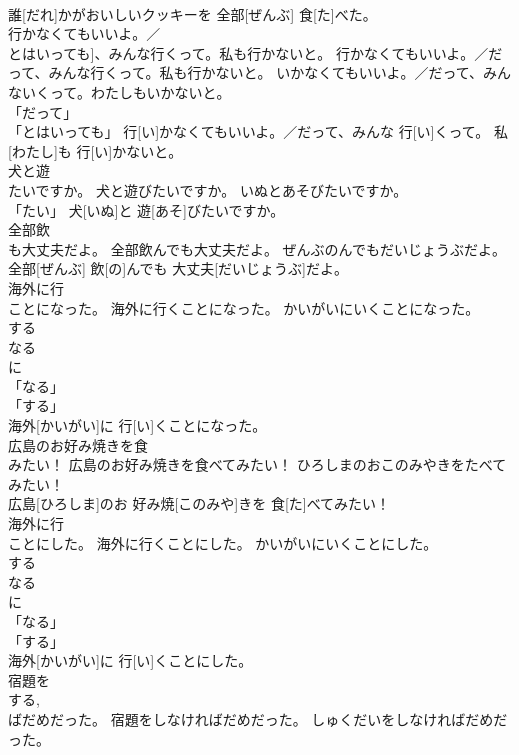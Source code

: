 \documentclass[8pt]{extreport}
\begin{document}
\begin{CJK}{UTF8}{min}
\\	誰[だれ]かがおいしいクッキーを 全部[ぜんぶ] 食[た]べた。		
\\	行かなくてもいいよ。／
\\	とはいっても]、みんな行くって。私も行かないと。	行かなくてもいいよ。／だって、みんな行くって。私も行かないと。	いかなくてもいいよ。／だって、みんないくって。わたしもいかないと。	
\\	「だって」 
\\	「とはいっても」	行[い]かなくてもいいよ。／だって、みんな 行[い]くって。 私[わたし]も 行[い]かないと。		
\\	犬と遊
\\	たいですか。	犬と遊びたいですか。	いぬとあそびたいですか。	
\\	「たい」	犬[いぬ]と 遊[あそ]びたいですか。		
\\	全部飲
\\	も大丈夫だよ。	全部飲んでも大丈夫だよ。	ぜんぶのんでもだいじょうぶだよ。	
\\	全部[ぜんぶ] 飲[の]んでも 大丈夫[だいじょうぶ]だよ。		
\\	海外に行
\\	ことになった。	海外に行くことになった。	かいがいにいくことになった。	
\\	する 
\\	なる 
\\	に 
\\	「なる」 
\\	「する」 
\\	海外[かいがい]に 行[い]くことになった。		
\\	広島のお好み焼きを食
\\	みたい！	広島のお好み焼きを食べてみたい！	ひろしまのおこのみやきをたべてみたい！	
\\	広島[ひろしま]のお 好み焼[このみや]きを 食[た]べてみたい！		
\\	海外に行
\\	ことにした。	海外に行くことにした。	かいがいにいくことにした。	
\\	する 
\\	なる 
\\	に 
\\	「なる」 
\\	「する」 
\\	海外[かいがい]に 行[い]くことにした。		
\\	宿題を
\\	する, 
\\	ばだめだった。	宿題をしなければだめだった。	しゅくだいをしなければだめだった。	

\end{CJK}
\end{document}
